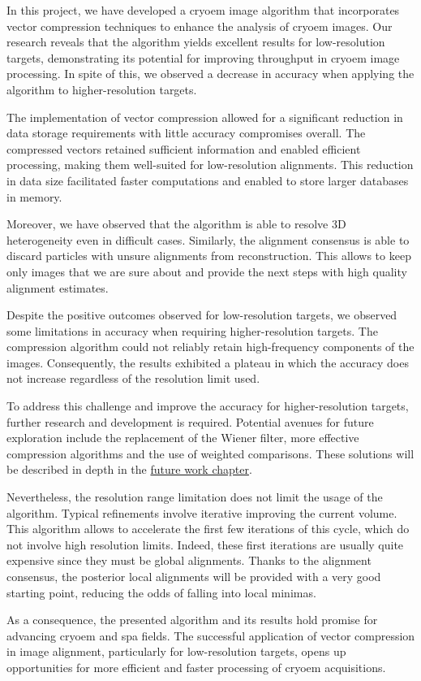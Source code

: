 \documentclass[../main.tex]{subfiles}
\begin{document}
In this project, we have developed a \gls{cryoem} image algorithm that incorporates vector compression techniques to enhance the analysis of  \gls{cryoem} images. Our research reveals that the algorithm yields excellent results for low-resolution targets, demonstrating its potential for improving throughput in \gls{cryoem} image processing. In spite of this, we observed a decrease in accuracy when applying the algorithm to higher-resolution targets.

The implementation of vector compression allowed for a significant reduction in data storage requirements with little accuracy compromises overall. The compressed vectors retained sufficient information and enabled efficient processing, making them well-suited for low-resolution alignments. This reduction in data size facilitated faster computations and enabled to store larger databases in memory.

Moreover, we have observed that the algorithm is able to resolve 3D heterogeneity even in difficult cases. Similarly, the alignment consensus is able to discard particles with unsure alignments from reconstruction. This allows to keep only images that we are sure about and provide the next steps with high quality alignment estimates.

Despite the positive outcomes observed for low-resolution targets, we observed some limitations in accuracy when requiring higher-resolution targets. The compression algorithm could not reliably retain high-frequency components of the images. Consequently, the results exhibited a plateau in which the accuracy does not increase regardless of the resolution limit used.

To address this challenge and improve the accuracy for higher-resolution targets, further research and development is required. Potential avenues for future exploration include the replacement of the Wiener filter, more effective compression algorithms and the use of weighted comparisons. These solutions will be described in depth in the \hyperlink{chap:future}{future work chapter}.

Nevertheless, the resolution range limitation does not limit the usage of the algorithm. Typical refinements involve iterative improving the current volume. This algorithm allows to accelerate the first few iterations of this cycle, which do not involve high resolution limits. Indeed, these first iterations are usually quite expensive since they must be global alignments. Thanks to the alignment consensus, the posterior local alignments will be provided with a very good starting point, reducing the odds of falling into local minimas.

As a consequence, the presented algorithm and its results hold promise for advancing \gls{cryoem} and \gls{spa} fields. The successful application of vector compression in image alignment, particularly for low-resolution targets, opens up opportunities for more efficient and faster processing of \gls{cryoem} acquisitions.
\end{document}

